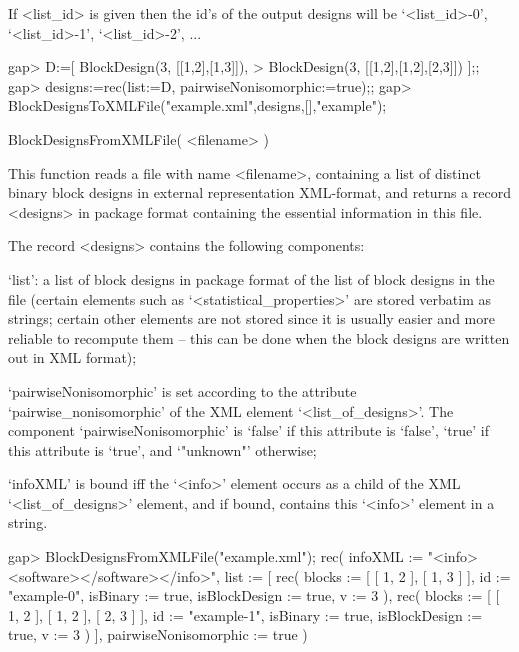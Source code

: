 If <list_id> is given then the id's of the output designs will be
`<list_id>-0', `<list_id>-1', `<list_id>-2', ...

\beginexample
gap> D:=[ BlockDesign(3, [[1,2],[1,3]]),                        
>      BlockDesign(3, [[1,2],[1,2],[2,3]]) ];;
gap> designs:=rec(list:=D, pairwiseNonisomorphic:=true);;
gap> BlockDesignsToXMLFile("example.xml",designs,[],"example"); 
\endexample


\>BlockDesignsFromXMLFile( <filename> )

This function reads a file with name <filename>, containing a list of
distinct binary block designs in external representation XML-format,
and returns a record  <designs> in {\DESIGN} package format containing
the essential information in this file.

The record <designs> contains the following components:

`list': a list of block designs in {\DESIGN} package format of
the list of block designs in the file (certain elements such as
`<statistical_properties>' are stored verbatim as strings; certain other
elements are not stored since it is usually easier and more reliable to
recompute them -- this can be done when the block designs are written
out in XML format);

`pairwiseNonisomorphic' is set according to the attribute
`pairwise_nonisomorphic' of the XML element `<list_of_designs>'.
The component `pairwiseNonisomorphic' is `false' if this attribute
is `false', `true' if this attribute is `true', and `"unknown"' otherwise;

`infoXML' is bound iff the `<info>' element occurs as a child of the
XML `<list_of_designs>' element, and if bound, contains this `<info>'
element in a string.

\beginexample
gap> BlockDesignsFromXMLFile("example.xml");
rec( 
  infoXML := "<info>\n<software>\n</software>\n</info>", 
  list := 
    [ 
      rec( blocks := [ [ 1, 2 ], [ 1, 3 ] ], id := "example-0", 
          isBinary := true, isBlockDesign := true, v := 3 ), 
      rec( blocks := [ [ 1, 2 ], [ 1, 2 ], [ 2, 3 ] ], id := "example-1", 
          isBinary := true, isBlockDesign := true, v := 3 ) ], 
  pairwiseNonisomorphic := true )
\endexample
